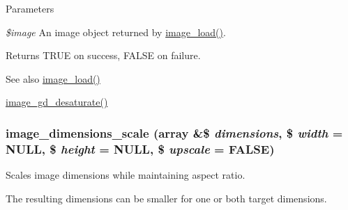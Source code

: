\begin{DoxyParams}{Parameters}
\item[{\em \$image}]An image object returned by \hyperlink{group__image_ga96098e5b039dc3906a656fa889a04776}{image\_\-load()}.\end{DoxyParams}
\begin{DoxyReturn}{Returns}
TRUE on success, FALSE on failure.
\end{DoxyReturn}
\begin{DoxySeeAlso}{See also}
\hyperlink{group__image_ga96098e5b039dc3906a656fa889a04776}{image\_\-load()} 

\hyperlink{group__image_ga2cb8090035dbb1a1e6a9c82cb52c9789}{image\_\-gd\_\-desaturate()} 
\end{DoxySeeAlso}
\hypertarget{group__image_gaf85b92c29d7c70328ccc3401357eaee9}{
\subsubsection[{image\_\-dimensions\_\-scale}]{\setlength{\rightskip}{0pt plus 5cm}image\_\-dimensions\_\-scale (array \&\$ {\em dimensions}, \/  \$ {\em width} = {\ttfamily NULL}, \/  \$ {\em height} = {\ttfamily NULL}, \/  \$ {\em upscale} = {\ttfamily FALSE})}}
\label{group__image_gaf85b92c29d7c70328ccc3401357eaee9}
Scales image dimensions while maintaining aspect ratio.

The resulting dimensions can be smaller for one or both target dimensions.


